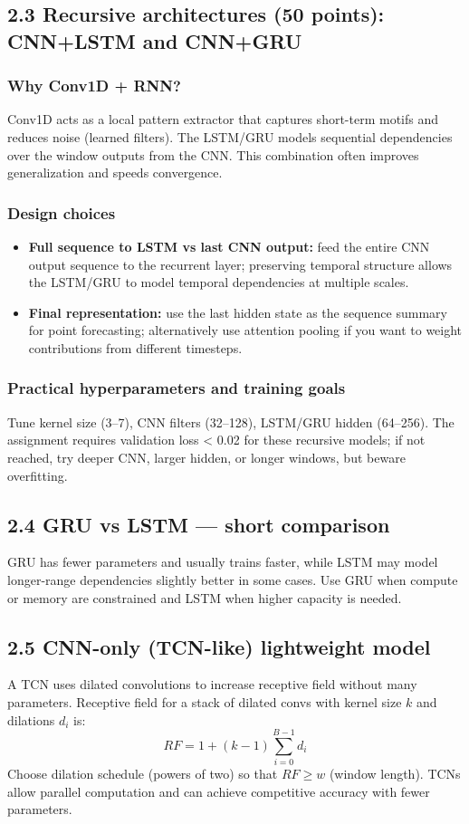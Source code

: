 \documentclass[conference]{IEEEtran}
\begin{document}
\subsection{2.3 Recursive architectures (50 points): CNN+LSTM and CNN+GRU}
\subsubsection{Why Conv1D + RNN?}
Conv1D acts as a local pattern extractor that captures short-term motifs and reduces noise (learned filters). The LSTM/GRU models sequential dependencies over the window outputs from the CNN. This combination often improves generalization and speeds convergence.

\subsubsection{Design choices}
\begin{itemize}
  \item \textbf{Full sequence to LSTM vs last CNN output:} feed the entire CNN output sequence to the recurrent layer; preserving temporal structure allows the LSTM/GRU to model temporal dependencies at multiple scales.\
  \item \textbf{Final representation:} use the last hidden state as the sequence summary for point forecasting; alternatively use attention pooling if you want to weight contributions from different timesteps.
\end{itemize}

\subsubsection{Practical hyperparameters and training goals}
Tune kernel size (3--7), CNN filters (32--128), LSTM/GRU hidden (64--256). The assignment requires validation loss < 0.02 for these recursive models; if not reached, try deeper CNN, larger hidden, or longer windows, but beware overfitting.

\subsection{2.4 GRU vs LSTM — short comparison}
GRU has fewer parameters and usually trains faster, while LSTM may model longer-range dependencies slightly better in some cases. Use GRU when compute or memory are constrained and LSTM when higher capacity is needed.

\subsection{2.5 CNN-only (TCN-like) lightweight model}
A TCN uses dilated convolutions to increase receptive field without many parameters. Receptive field for a stack of dilated convs with kernel size $k$ and dilations $d_i$ is:
$$RF = 1 + (k-1)\sum_{i=0}^{B-1} d_i$$
Choose dilation schedule (powers of two) so that $RF \ge w$ (window length). TCNs allow parallel computation and can achieve competitive accuracy with fewer parameters.
\end{document}
